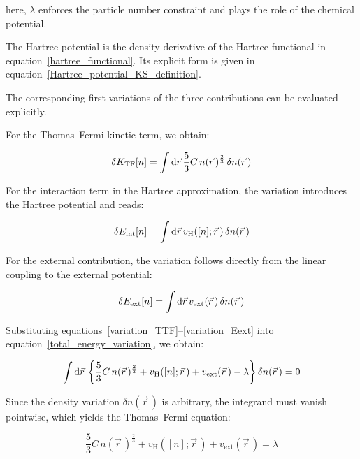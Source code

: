 here, $\lambda$ enforces the particle number constraint and plays the role of the chemical potential.

The Hartree potential is the density derivative of the Hartree functional in equation~\eqref{hartree_functional}.
Its explicit form is given in equation~\eqref{Hartree_potential_KS_definition}.

The corresponding first variations of the three contributions can be evaluated explicitly.

For the Thomas--Fermi kinetic term, we obtain:

\begin{equation}
    \delta K_\mathrm{TF}[n]
    = \int\mathrm{d}{\vec{r}}\,\frac{5}{3}C\,n(\vec{r}\,)^{\frac{2}{3}}\,\delta n(\vec{r}\,)
\label{variation_TTF}
\end{equation}

For the interaction term in the Hartree approximation, the variation introduces the Hartree potential and reads:

\begin{equation}
    \delta E_\mathrm{int}[n]
    = \int\mathrm{d}{\vec{r}}\,v_\mathrm{H}([n];\vec{r}\,)\,\delta n(\vec{r}\,)
\label{variation_Eint}
\end{equation}

For the external contribution, the variation follows directly from the linear coupling to the external potential:

\begin{equation}
    \delta E_\mathrm{ext}[n]
    = \int\mathrm{d}{\vec{r}}\,v_\mathrm{ext}(\vec{r}\,)\,\delta n(\vec{r}\,)
\label{variation_Eext}
\end{equation}

Substituting equations~\eqref{variation_TTF}--\eqref{variation_Eext} into equation~\eqref{total_energy_variation}, we obtain:

\begin{equation}
    \int\mathrm{d}{\vec{r}}\,\left\{\frac{5}{3}C\,n(\vec{r}\,)^{\frac{2}{3}}+v_\mathrm{H}([n];\vec{r}\,)+v_\mathrm{ext}(\vec{r}\,)-\lambda\right\}\delta n(\vec{r}\,)=0
\label{total_energy_minimization}
\end{equation}

Since the density variation $\delta n(\vec{r}\,)$ is arbitrary, the integrand must vanish pointwise, which yields the Thomas--Fermi equation:

\begin{equation}
    \frac{5}{3}C\,n(\vec{r}\,)^{\frac{2}{3}}+v_\mathrm{H}([n];\vec{r}\,)+v_\mathrm{ext}(\vec{r}\,)=\lambda
\label{Thomas_Fermi_equation}
\end{equation}

